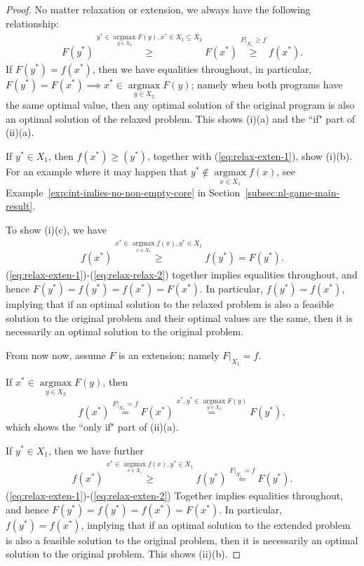 \documentclass[11pt]{article}\usepackage[]{graphicx}\usepackage[]{xcolor}
\DeclareMathOperator*{\argmax}{argmax}
\begin{document}
\begin{proof}
No matter relaxation or extension, we always have the following relationship:
\begin{eqnarray}\label{eq:relax-exten-1}
F(y^*)\overset{y^*\in\argmax\limits_{y\in X_2} F(y), x^*\in X_1\subseteq X_2}{\ge} F(x^*)
\overset{F|_{X_1}\ge f}{\ge} f(x^*).
\end{eqnarray}
If $F(y^*)=f(x^*)$, then we have equalities throughout, in particular, $F(y^*)=F(x^*)\implies x^*\in \argmax\limits_{y\in X_2} F(y)$; namely when both programs have the same optimal value, then any optimal solution of the original program is also an optimal solution of the relaxed problem. This shows (i)(a) and the ``if" part of (ii)(a). 

If $y^* \in X_1$, then $f(x^*)\ge (y^*)$, together with (\ref{eq:relax-exten-1}), show (i)(b). For an example where it may happen that $y^*\notin \argmax\limits_{x\in X_1} f(x)$, see Example~\ref{exp:int-imlies-no-non-empty-core} in Section~\ref{subsec:nl-game-main-result}. 


To show (i)(c), we have  
\begin{eqnarray}\label{eq:relax-relax-2}
f(x^*)\overset{x^*\in\argmax\limits_{x\in X_1} f(x), y^*\in X_1}{\ge} f(y^*)=F(y^*).
\end{eqnarray}
(\ref{eq:relax-exten-1})-(\ref{eq:relax-relax-2}) together implies equalities throughout, and hence $F(y^*)=f(y^*)=f(x^*)=F(x^*)$. In particular, $f(y^*)=f(x^*)$, implying that if an optimal solution to the relaxed problem is also a feasible solution to the original problem and their optimal values are the same, then it is necessarily an optimal solution to the original problem. 


From now now, assume $F$ is an extension; namely $F|_{X_1}=f$. 

If $x^*\in\argmax\limits_{y\in X_2} F(y)$, then 
\[
f(x^*)\overset{F|_{X_1}=f}{=}F(x^*)\overset{x^*, y^*\in\argmax\limits_{y\in X_2} F(y)}{=}F(y^*),
\]
which shows the ``only if" part of (ii)(a).

If $y^*\in X_1$, then we have further 
\begin{eqnarray}\label{eq:relax-exten-2}
f(x^*)\overset{x^*\in\argmax\limits_{x\in X_1} f(x), y^*\in X_1}{\ge} f(y^*)\overset{F|_{X_1}=f}{=}F(y^*).
\end{eqnarray}
(\ref{eq:relax-exten-1})-(\ref{eq:relax-exten-2}) Together implies equalities throughout, and hence $F(y^*)=f(y^*)=f(x^*)=F(x^*)$. In particular, $f(y^*)=f(x^*)$, implying that if an optimal solution to the extended problem is also a feasible solution to the original problem, then it is necessarily an optimal solution to the original problem. This shows (ii)(b). 

\end{proof}
\end{document}
